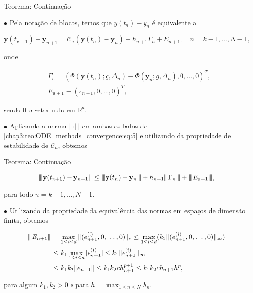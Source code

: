 \documentclass{beamer}
\newcommand{\vertiii}[1]{{\left\vert\kern-0.25ex\left\vert\kern-0.25ex\left\vert #1 
    \right\vert\kern-0.25ex\right\vert\kern-0.25ex\right\vert}}
\theoremstyle{plain}
\theoremstyle{definition}
\begin{document}

\begin{frame}{Teorema: Continuação}

    \small

    \phantom{aa} $\bullet$ Pela notação de blocos, temos que $y(t_n) - y_n$ é equivalente a 

    \begin{equation}
      \mathbf{y}\left(t_{n+1}\right)-\mathbf{y}_{n+1}=\mathcal{C}_{n}\left(\mathbf{y}\left(t_{n}\right)-\mathbf{y}_{n}\right)+h_{n+1} \Gamma_{n}+E_{n+1}, \quad n=k-1, \ldots, N-1 
      \label{chap3:teo:ODE_methods_convergence:eq:5}, 
    \end{equation}
  
    \noindent
    onde

    \begin{align*}
      &\Gamma_{n}=\left(\Phi\left(\mathbf{y}\left(t_{n}\right) ; g, \Delta_{n}\right)-\Phi\left(\mathbf{y}_{n} ; g, \Delta_{n}\right), 0, \ldots, 0\right)^{T}, \\
      &E_{n+1}=\left(\epsilon_{n+1}, 0, \ldots, 0\right)^{T},
    \end{align*}

    \noindent
    sendo 0 o vetor nulo em \(\mathbb{R}^{d}\). 

    \phantom{aa} $\bullet$ Aplicando a norma $\vertiii{\cdot}$ em ambos os lados de \eqref{chap3:teo:ODE_methods_convergence:eq:5} e utilizando da propriedade de estabilidade de $\mathcal{C}_n$, obtemos

\end{frame}



\begin{frame}{Teorema: Continuação}

    \small

    \[
      \vertiii{\mathbf{y}(t_{n+1})-\mathbf{y}_{n+1}} \leq \vertiii{\mathbf{y}(t_{n})-\mathbf{y}_{n}}+h_{n+1} \vertiii{\Gamma _ { n }} + \vertiii{E_{n+1} },
    \]

    \noindent
    para todo \(n=k-1, \ldots, N-1\).

    \phantom{aa} $\bullet$ Utilizando da propriedade da equivalência das normas em espaços de dimensão finita, obtemos 

    \[
      \begin{aligned}
        \vertiii{E_{n+1}} &= \max_{1 \leq i \leq d} \| (e_{n+1}^{(i)}, 0, \dots, 0) \|_* \leq 
        \max_{1 \leq i \leq d} ( k_1 \| (e_{n+1}^{(i)}, 0, \dots, 0) \|_\infty ) \\
                          &\leq k_1 \max_{1 \leq i \leq d} |e_{n+1}^{(i)}| 
        \leq k_1 \|e_{n+1}^{(i)}\|_\infty  \\
                          &\leq k_1 k_2 \|e_{n+1}\| \leq k_1 k_2 c h_{n+1}^{p+1} \leq k_1 k_2 c h_{n+1} h^{p},
      \end{aligned}
    \]

    \noindent
    para algum $k_1, k_2 > 0$ e para $h = \max_{1 \leq n \leq N} h_n$.
\end{frame}
\end{document}
